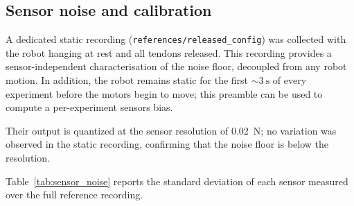 \documentclass[14pt, a4paper]{article}
\begin{document}
\subsection{Sensor noise and calibration}\label{sec:sensors_noise}


A dedicated static recording (\texttt{references/released\_config}) was collected with the robot hanging at rest and all tendons released.
This recording provides a sensor-independent characterisation of the noise floor, decoupled from any robot motion.
In addition, the robot remains static for the first $\sim\SI{3}{\second}$ of every experiment before the motors begin to move; this preamble can be used to compute a per-experiment sensors bias.

Their output is quantized at the sensor resolution of \SI{0.02}{\newton}; no variation was observed in the static recording, confirming that the noise floor is below the resolution.

Table~\ref{tab:sensor_noise} reports the standard deviation of each sensor measured over the full reference recording.
\end{document}
